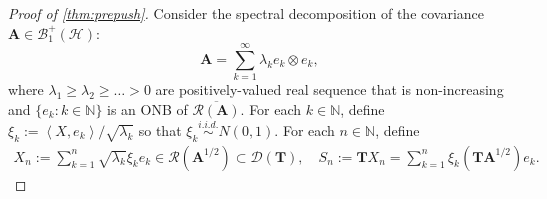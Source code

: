 \documentclass[noinfoline]{imsart}\setcounter{tocdepth}{2}
\renewcommand{\b}[1]{\mathbb{#1}} %
\newcommand{\m}[1]{\mathbf{#1}} %
\renewcommand{\c}[1]{\mathcal{#1}} %
\newcommand{\innpr}[2]{{\left\langle {#1},{#2}\right\rangle}} %
\theoremstyle{plain}
\begin{document}
\begin{proof}[Proof of \cref{thm:prepush}]
Consider the spectral decomposition of the covariance $\m{A} \in \c{B}_{1}^{+}(\c{H})$:
\begin{equation*}
    \m{A} = \sum_{k=1}^{\infty} \lambda_{k} e_{k} \otimes e_{k},
\end{equation*}
where $\lambda_{1} \ge \lambda_{2} \ge \dots >0$ are positively-valued real sequence that is non-increasing and $\{e_{k} : k \in \b{N}\}$ is an ONB of $\overline{\c{R}(\m{A})}$. For each $k \in \b{N}$, define $\xi_{k} := \innpr{X}{e_{k}} / \sqrt{\lambda_{k}}$ so that $\xi_{k} \stackrel{i.i.d.}{\sim} N(0, 1)$. For each $n \in \b{N}$, define
\begin{align*}
    X_{n} := \sum_{k=1}^{n} \sqrt{\lambda_{k}} \xi_{k} e_{k} \in \c{R}(\m{A}^{1/2}) \subset \c{D}(\m{T}), \quad
    S_{n} := \m{T} X_{n} = \sum_{k=1}^{n} \xi_{k} (\m{T} \m{A}^{1/2}) e_{k}.
\end{align*}


\end{proof}
\end{document}

